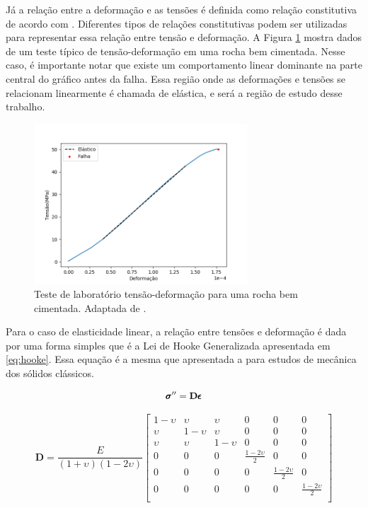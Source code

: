 Já a relação entre a deformação e as tensões é definida como relação constitutiva de acordo com \citet{ResGeomec}. Diferentes tipos de relações constitutivas podem ser utilizadas para representar essa relação entre tensão e deformação. A Figura \ref{fig:stress_strain} mostra dados de um teste típico de tensão-deformação em uma rocha bem cimentada. Nesse caso, é importante notar que existe um comportamento linear dominante na parte central do gráfico antes da falha. Essa região onde as deformações e tensões se relacionam linearmente é chamada de elástica, e será a região de estudo desse trabalho. 


\begin{figure}[!htbp]
\centering
\includegraphics[width=8cm]{chap01/figs/stress_strain.png}
\caption{Teste de laboratório tensão-deformação para uma rocha bem cimentada. Adaptada de \citet{ResGeomec}.}
\label{fig:stress_strain}
\end{figure}


Para o caso de elasticidade linear, a relação entre tensões e deformação é dada por uma forma simples  que é a Lei de Hooke Generalizada apresentada em \eqref{eq:hooke}. Essa equação é a mesma que apresentada a para estudos de mecânica dos sólidos clássicos.

\begin{equation}{
\label{eq:hooke}
\pmb{\sigma}^{\prime\prime}= \mathbf{D} \pmb{\epsilon}}
\end{equation}


\begin{equation}\label{eq:ddefinition}
    \mathbf{D} = \frac{E}{(1+\upsilon)(1-2\upsilon)} \begin{bmatrix}
    1-\upsilon & \upsilon    &  \upsilon & 0 & 0 & 0     \\
      \upsilon &  1-\upsilon &  \upsilon & 0 & 0 & 0     \\
      \upsilon & \upsilon   &  1-\upsilon &  0 & 0 & 0   \\
    0& 0& 0 & \frac{1-2\upsilon}{2} & 0 & 0              \\
    0& 0& 0 & 0 &\frac{1-2\upsilon}{2} & 0               \\
    0& 0& 0 & 0 & 0 &  \frac{1-2\upsilon}{2}             \\
\end{bmatrix}
\end{equation}

